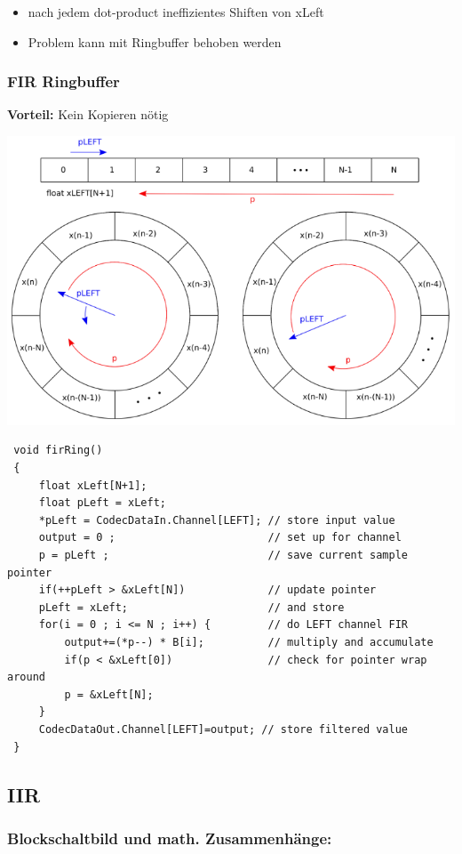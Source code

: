 \documentclass[10pt,a4paper]{article}
\begin{document}
\begin{itemize}
    \item nach jedem dot-product ineffizientes Shiften von xLeft
    \item Problem kann mit Ringbuffer behoben werden
\end{itemize}

\subsubsection{FIR Ringbuffer}
\textbf{Vorteil: } Kein Kopieren nötig
\begin{center}    
  \includegraphics[width=.5\textwidth]{./img/ring.png}  
\end{center}  

\begin{verbatim}
 void firRing()
 {
     float xLeft[N+1];
     float pLeft = xLeft;
     *pLeft = CodecDataIn.Channel[LEFT]; // store input value
     output = 0 ;                        // set up for channel
     p = pLeft ;                         // save current sample pointer
     if(++pLeft > &xLeft[N])             // update pointer
     pLeft = xLeft;                      // and store
     for(i = 0 ; i <= N ; i++) {         // do LEFT channel FIR
         output+=(*p--) * B[i];          // multiply and accumulate
         if(p < &xLeft[0])               // check for pointer wrap around
         p = &xLeft[N];
     }
     CodecDataOut.Channel[LEFT]=output; // store filtered value
 }
 \end{verbatim}

\newpage 
\subsection{IIR}
\subsubsection{Blockschaltbild und math. Zusammenhänge:}
\end{document}
